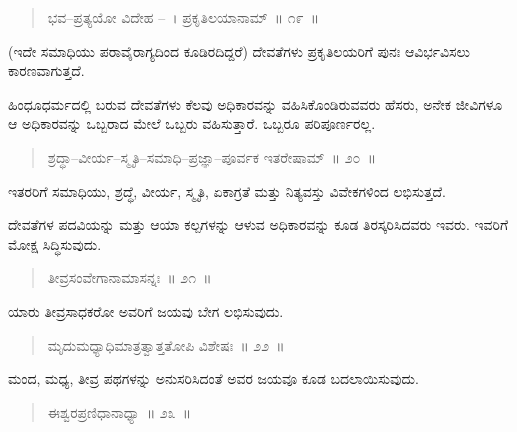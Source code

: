 \vspace{-0.3cm}

\begin{verse}
ಭವ–ಪ್ರತ್ಯಯೋ ವಿದೇಹ –~। ಪ್ರಕೃತಿಲಯಾನಾಮ್​~॥ ೧೯~॥
\end{verse}

\vspace{-0.3cm}

(ಇದೇ ಸಮಾಧಿಯು ಪರಾವೈರಾಗ್ಯದಿಂದ ಕೂಡಿರದಿದ್ದರೆ) ದೇವತೆಗಳು ಪ್ರಕೃತಿಲಯರಿಗೆ ಪುನಃ ಆವಿರ್ಭವಿಸಲು ಕಾರಣವಾಗುತ್ತದೆ. 

ಹಿಂಧೂಧರ್ಮದಲ್ಲಿ ಬರುವ ದೇವತೆಗಳು ಕೆಲವು ಅಧಿಕಾರವನ್ನು ವಹಿಸಿಕೊಂಡಿರುವ\break ವರು ಹೆಸರು, ಅನೇಕ ಜೀವಿಗಳೂ ಆ ಅಧಿಕಾರವನ್ನು ಒಬ್ಬರಾದ ಮೇಲೆ ಒಬ್ಬರು ವಹಿಸುತ್ತಾರೆ. ಒಬ್ಬರೂ ಪರಿಪೂರ್ಣರಲ್ಲ. 

\vspace{-0.3cm}

\begin{verse}
ಶ್ರದ್ಧಾ–ವೀರ್ಯ–ಸ್ಮೃತಿ–ಸಮಾಧಿ–ಪ್ರಜ್ಞಾ–ಪೂರ್ವಕ ಇತರೇಷಾಮ್​~॥ ೨೦~॥
\end{verse}

\vspace{-0.3cm}

ಇತರರಿಗೆ ಸಮಾಧಿಯು, ಶ್ರದ್ಧೆ, ವೀರ್ಯ, ಸ್ಮೃತಿ, ಏಕಾಗ್ರತೆ ಮತ್ತು ನಿತ್ಯವಸ್ತು ವಿವೇಕಗಳಿಂದ ಲಭಿಸುತ್ತದೆ. 

ದೇವತೆಗಳ ಪದವಿಯನ್ನು ಮತ್ತು ಆಯಾ ಕಲ್ಪಗಳನ್ನು ಆಳುವ ಅಧಿಕಾರವನ್ನು ಕೂಡ ತಿರಸ್ಕರಿಸಿದವರು ಇವರು. ಇವರಿಗೆ ಮೋಕ್ಷ ಸಿದ್ಧಿಸುವುದು. 

\vspace{-0.3cm}

\begin{verse}
ತೀವ್ರಸಂವೇಗಾನಾಮಾಸನ್ನಃ~॥ ೨೧~॥
\end{verse}

\vspace{-0.3cm}

ಯಾರು ತೀವ್ರಸಾಧಕರೋ ಅವರಿಗೆ ಜಯವು ಬೇಗ ಲಭಿಸುವುದು. 

\vspace{-0.3cm}

\begin{verse}
ಮೃದುಮಧ್ಯಾಧಿಮಾತ್ರತ್ವಾತ್ತತೋಪಿ ವಿಶೇಷಃ~॥ ೨೨~॥
\end{verse}

\vspace{-0.3cm}

ಮಂದ, ಮಧ್ಯ, ತೀವ್ರ ಪಥಗಳನ್ನು ಅನುಸರಿಸಿದಂತೆ ಅವರ ಜಯವೂ ಕೂಡ ಬದಲಾಯಿಸುವುದು. 

\vspace{-0.35cm}

\begin{verse}
ಈಶ್ವರಪ್ರಣಿಧಾನಾಧ್ಯಾ~॥ ೨೩~॥
\end{verse}

